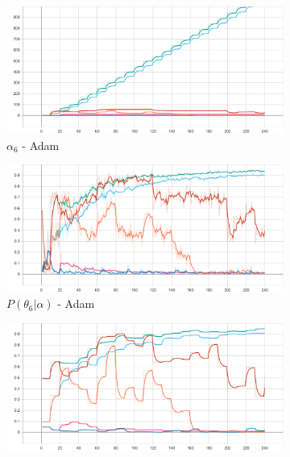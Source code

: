 \begin{figure}[htbp]
    \begin{subfigure}{0.5\textwidth}
		\centering
		\includegraphics[width=\textwidth]{analysis/bhh_case_study/iris/alpha[6].png}
		\caption{$\alpha_{6}$ - \Acs{Adam}}
		\label{fig:results:case_study:iris:adam:alpha:6}
	\end{subfigure}
    \begin{subfigure}{0.5\textwidth}
		\centering
		\includegraphics[width=\textwidth]{analysis/bhh_case_study/iris/theta[6].png}
		\caption{$P(\theta_{6} | \alpha)$ - \Acs{Adam}}
		\label{fig:results:case_study:iris:adam:p_theta:6}
	\end{subfigure}
	\par\bigskip
	\begin{subfigure}{0.5\textwidth}
		\centering
		\includegraphics[width=\textwidth]{analysis/bhh_case_study/iris/p_H[6].png}

\end{subfigure}
\end{figure}
